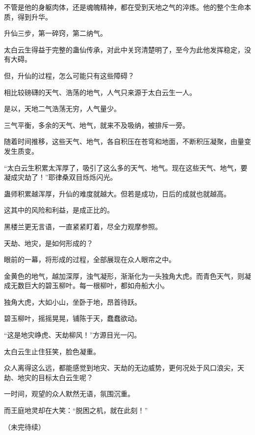 \begin{this_body}
不管是他的身躯肉体，还是魂魄精神，都在受到天地之气的淬炼。他的整个生命本质，得到升华。

升仙三步，第一碎窍，第二纳气。

太白云生得益于完整的蛊仙传承，对此中关窍清楚明了，至今为此他发挥稳定，没有大碍。

但，升仙的过程，怎么可能只有这些障碍？

相比较磅礴的天气、浩荡的地气，人气只来源于太白云生一人。

是以，天地二气浩荡无穷，人气量少。

三气平衡，多余的天气、地气，就来不及吸纳，被排斥一旁。

随着时间推移，这些天气、地气，各自积压在苍穹和地面，不断积压凝聚，由量变发生质变。

“太白云生积累太浑厚了，吸引了这么多的天气、地气。现在这些天气、地气，要凝成灾劫了！”耶律桑双目烁烁闪光。

蛊师积累越浑厚，升仙的难度就越大。但若是成功，日后的成就也就越高。

这其中的风险和利益，是成正比的。

黑楼兰更无言语，一直紧紧盯着，尽全力观摩参照。

天劫、地灾，是如何形成的？

眼前的一幕，将形成的过程，全部展现在众人眼帘之中。

金黄色的地气，越加深厚，浊气凝形，渐渐化为一头独角大虎。而青色天气，则凝成无数巨大的碧玉柳叶。每一根柳叶，都如舟船大小。

独角大虎，大如小山，坐卧于地，昂首待跃。

碧玉柳叶，摇摇晃晃，铺陈于天，蠢蠢欲动。

“这是地灾峥虎、天劫柳风！”方源目光一闪。

太白云生止住狂笑，脸色凝重。

众人离得这么远，都能感觉到地灾、天劫的无边威势，更何况处于风口浪尖，天劫、地灾的目标太白云生呢？

一时间，观望的众人默然无语，氛围沉重。

而王庭地灵却在大笑：“脱困之机，就在此刻！”

（未完待续）

\end{this_body}

